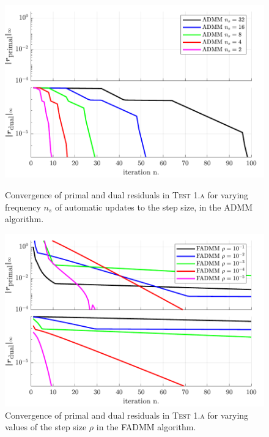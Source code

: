 \documentclass[final,3p]{elsarticle}
\begin{document}
\begin{figure}[!tbp]
  \centering
  \begin{minipage}[t]{0.48\textwidth}
    \includegraphics[width=\textwidth]{pics/t6_primdual_a_ns.pdf}
    \caption{Convergence of primal and dual residuals in \textsc{Test 1.a} for varying frequency $n_s$ of automatic updates to the step size, in the ADMM algorithm.}
		\label{fig:t6_primdual_a_ns}
  \end{minipage}
  \hfill
	\begin{minipage}[t]{0.48\textwidth}
    \includegraphics[width=\textwidth]{pics/t6_primdual_a_rho.pdf}
    \caption{Convergence of primal and dual residuals in \textsc{Test 1.a} for varying values of the step size $\rho$ in the FADMM algorithm.}
		\label{fig:t6_primdual_a_rho}
  \end{minipage}
\end{figure}
\end{document}
